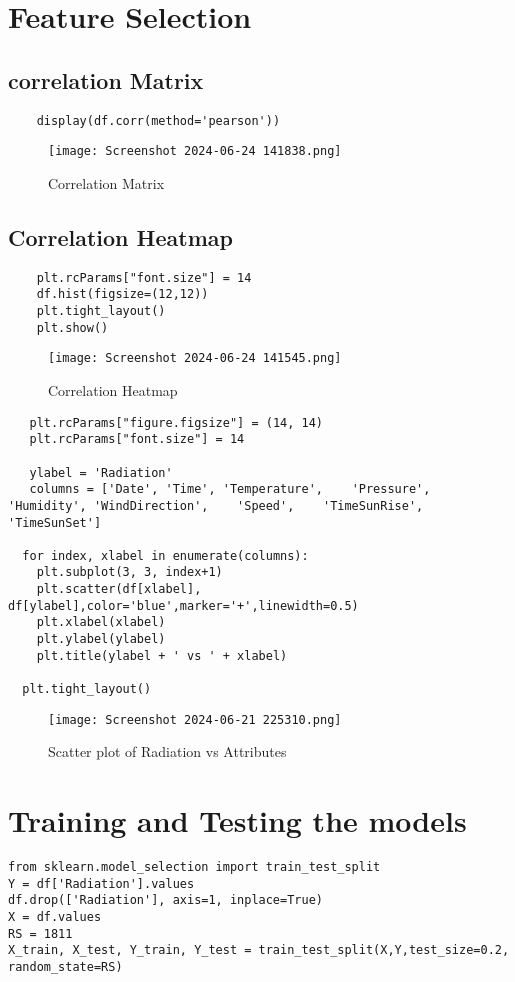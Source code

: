 \documentclass[12pt,a4paper]{report}
\begin{document}
\section{Feature Selection}
\subsection{correlation Matrix}
\begin{lstlisting}
    display(df.corr(method='pearson'))
\end{lstlisting}
\begin{figure} [!ht]
    \centering
    \texttt{[image: Screenshot 2024-06-24 141838.png]}
    \caption{Correlation Matrix}
    \label{fig:enter-label}
\end{figure}
\subsection{Correlation Heatmap}
\begin{lstlisting}
    plt.rcParams["font.size"] = 14
    df.hist(figsize=(12,12))
    plt.tight_layout()
    plt.show()
\end{lstlisting}
\begin{figure} [!ht]
    \centering
    \texttt{[image: Screenshot 2024-06-24 141545.png]}
    \caption{Correlation Heatmap}
    \label{fig:enter-label}
\end{figure}
\begin{lstlisting}
   plt.rcParams["figure.figsize"] = (14, 14)
   plt.rcParams["font.size"] = 14

   ylabel = 'Radiation'
   columns = ['Date', 'Time', 'Temperature',	'Pressure',	'Humidity',	'WindDirection',	'Speed',	'TimeSunRise',	'TimeSunSet']

  for index, xlabel in enumerate(columns):
    plt.subplot(3, 3, index+1)
    plt.scatter(df[xlabel], df[ylabel],color='blue',marker='+',linewidth=0.5)
    plt.xlabel(xlabel)
    plt.ylabel(ylabel)
    plt.title(ylabel + ' vs ' + xlabel)

  plt.tight_layout()
\end{lstlisting}
\begin{figure} [!ht]
    \centering
    \texttt{[image: Screenshot 2024-06-21 225310.png]}
    \caption{Scatter plot of Radiation vs Attributes}
    \label{fig:enter-label}
\end{figure}
\section{Training and Testing the models}
\begin{lstlisting}
from sklearn.model_selection import train_test_split 
Y = df['Radiation'].values 
df.drop(['Radiation'], axis=1, inplace=True) 
X = df.values 
RS = 1811 
X_train, X_test, Y_train, Y_test = train_test_split(X,Y,test_size=0.2, 
random_state=RS) 
\end{lstlisting}
\end{document}
